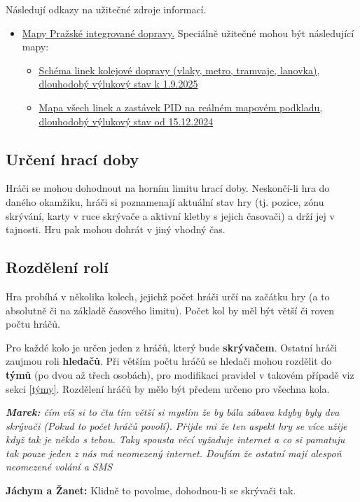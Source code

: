 \documentclass{book}
\newenvironment{reasoning}{\begin{small}\itshape}{\end{small}}
\begin{document}
Následují odkazy na užitečné zdroje informací.
\begin{itemize}
	\item \href{https://pid.cz/mapy-a-schemata/}{Mapy Pražské integrované dopravy.} Speciálně užitečné mohou být následující mapy:
	\begin{itemize}
		\item \href{https://pid.cz/wp-content/uploads/mapy/schemata-trvala/a3_kolejova_doprava_vyluka.pdf}{Schéma linek kolejové dopravy (vlaky, metro, tramvaje, lanovka), dlouhodobý výlukový stav k 1.9.2025}
		\item \href{https://pid.cz/wp-content/uploads/mapy/schemata-trvala/PrahaA1.pdf}{Mapa všech linek a zastávek PID na reálném mapovém podkladu, dlouhodobý výlukový stav od 15.12.2024}
	\end{itemize}
\end{itemize}

\subsection{Určení hrací doby}

Hráči se mohou dohodnout na horním limitu hrací doby. Neskončí-li hra do daného okamžiku, hráči si poznamenají aktuální stav hry (tj. pozice, zónu skrývání, karty v ruce skrývače a aktivní kletby s jejich časovači) a drží jej v tajnosti. Hru pak mohou dohrát v jiný vhodný čas.

\subsection{Rozdělení rolí}

Hra probíhá v několika kolech, jejichž počet hráči určí na začátku hry (a to absolutně či na základě časového limitu). Počet kol by měl být větší či roven počtu hráčů.

Pro každé kolo je určen jeden z hráčů, který bude \textbf{skrývačem}. Ostatní hráči zaujmou roli \textbf{hledačů}. Při větším počtu hráčů se hledači mohou rozdělit do \textbf{týmů} (po dvou až třech osobách), pro modifikaci pravidel v takovém případě viz sekci \ref{týmy}. Rozdělení hráčů by mělo být předem určeno pro všechna kola.

\begin{reasoning}
	\textbf{Marek:} čím víš si to čtu tím větší si myslím že by bála zábava kdyby byly dva skrývači (Pokud to počet hráčů povolí). Přijde mi že ten aspekt hry se více užije když tak je někdo s tebou.
	Taky spousta věcí vyžaduje internet a co si pamatuju tak pouze jeden z nás má neomezený internet.
	Doufám že ostatní mají alespoň neomezené volání a SMS

	\textbf{Jáchym a Žanet:} Klidně to povolme, dohodnou-li se skrývači tak.
\end{reasoning}
\end{document}
